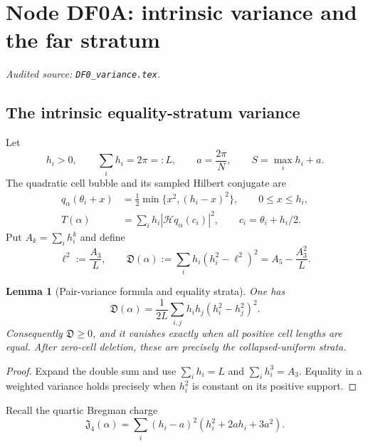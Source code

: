 \documentclass[11pt]{amsart}
\numberwithin{equation}{section}
\newtheorem{lemma}[theorem]{Lemma}
\theoremstyle{definition}
\theoremstyle{remark}
\newcommand{\Hil}{\mathcal H}
\newcommand{\Jfour}{\mathfrak J_4}
\begin{document}
\begingroup
\section{Node DF0A: intrinsic variance and the far stratum}
\label{module:DF0A}
\noindent\textit{Audited source: \nolinkurl{DF0_variance.tex}.}
\subsection{The intrinsic equality-stratum variance}

Let
\begin{equation}\label{DF0A:eq:data}
 h_i>0,\qquad \sum_i h_i=2\pi=:L,
 \qquad a=\frac{2\pi}{N},\qquad
 S=\max_i h_i+a.
\end{equation}
The quadratic cell bubble and its sampled Hilbert conjugate are
\begin{align}
 q_\alpha(\theta_i+x)
 &=\frac12\min\{x^2,(h_i-x)^2\},\qquad 0\le x\le h_i,
 \label{DF0A:eq:q}\\
 T(\alpha)&=\sum_i h_i|\Hil q_\alpha(c_i)|^2,
 \qquad c_i=\theta_i+h_i/2.\label{DF0A:eq:T}
\end{align}
Put $A_k=\sum_i h_i^k$ and define
\begin{equation}\label{DF0A:eq:D}
 \ell^2:=\frac{A_3}{L},
 \qquad
 \boxed{\mathfrak D(\alpha)
 :=\sum_i h_i(h_i^2-\ell^2)^2
 =A_5-\frac{A_3^2}{L}.}
\end{equation}

\begin{lemma}[Pair-variance formula and equality strata]
\label{DF0A:lem:pair}
One has
\begin{equation}\label{DF0A:eq:pair}
 \mathfrak D(\alpha)
 =\frac1{2L}\sum_{i,j}h_ih_j(h_i^2-h_j^2)^2.
\end{equation}
Consequently $\mathfrak D\ge0$, and it vanishes exactly when all
positive cell lengths are equal.  After zero-cell deletion, these are
precisely the collapsed-uniform strata.
\end{lemma}

\begin{proof}
Expand the double sum and use $\sum_i h_i=L$ and
$\sum_i h_i^3=A_3$.  Equality in a weighted variance holds precisely
when $h_i^2$ is constant on its positive support.
\end{proof}

Recall the quartic Bregman charge
\begin{equation}\label{DF0A:eq:J}
 \Jfour(\alpha)=\sum_i(h_i-a)^2(h_i^2+2ah_i+3a^2).
\end{equation}
\end{document}
